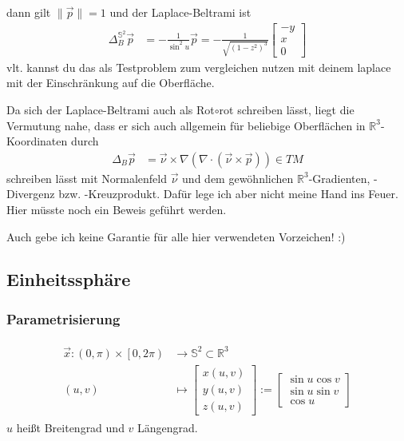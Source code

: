 \documentclass{scrartcl}
\newcommand{\R}{\mathds{R}}
\begin{document}
  dann gilt \( \|\vec{p}\| = 1 \) und der Laplace-Beltrami ist
  \begin{align}
    \Delta^{ \mathds{S}^{2}}_{B}\vec{p} &= -\frac{1}{\sin^{2}u} \vec{p} =
        -\frac{1}{\sqrt{\left( 1-z^{2} \right)^{3}}}
            \begin{bmatrix}
            -y \\ x \\ 0
           \end{bmatrix}
  \end{align}
  vlt. kannst du das als Testproblem zum vergleichen nutzen mit deinem laplace mit der Einschränkung auf die Oberfläche.

  Da sich der Laplace-Beltrami auch als Rot\( \circ \)rot schreiben lässt, liegt die Vermutung nahe, dass er sich auch allgemein für beliebige Oberflächen in \( \R^{3} \)-Koordinaten durch
  \begin{align}
    \Delta_{B}\vec{p} &= \vec{\nu} \times \nabla \left( \nabla \cdot \left( \vec{\nu} \times \vec{p} \right) \right) \in TM
  \end{align}
  schreiben lässt
  mit Normalenfeld \( \vec{\nu} \) und dem gewöhnlichen \( \R^{3} \)-Gradienten, -Divergenz bzw. -Kreuzprodukt.
  Dafür lege ich aber nicht meine Hand ins Feuer. Hier müsste noch ein Beweis geführt werden.

  Auch gebe ich keine Garantie für alle hier verwendeten Vorzeichen! :) 



  \subsection{Einheitssphäre}
    \label{sphere}

    \subsubsection{Parametrisierung}
      \begin{align}
      \begin{aligned}
        \vec{x}: \left( 0, \pi \right) \times \left[ 0 , 2\pi \right)
                    &\rightarrow \mathds{S}^{2} \subset \R^{3} \\
             \left( u,v \right) 
                    &\mapsto\begin{bmatrix}
                              x(u,v) \\ y(u,v) \\ z(u,v)
                            \end{bmatrix}
                    := \begin{bmatrix}
                        \sin u \cos v \\
                        \sin u \sin v \\
                        \cos u
                      \end{bmatrix}
      \end{aligned}
      \end{align}
      \( u \) heißt Breitengrad und \( v \) Längengrad.
\end{document}
